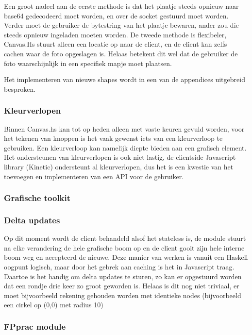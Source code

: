 Een groot nadeel aan de eerste methode is dat het plaatje steeds opnieuw naar base64 gedecodeerd moet worden, en over de socket gestuurd moet worden. Verder moet de gebruiker de bytestring van het plaatje bewaren, ander zou die steeds opnieuw ingeladen moeten worden. De tweede methode is flexibeler, Canvas.Hs stuurt alleen een locatie op naar de client, en de client kan zelfs cachen waar de foto opgeslagen is. Helaas betekent dit wel dat de gebruiker de foto waarschijnlijk in een specifiek mapje moet plaatsen.

Het implementeren van nieuwe shapes wordt in een van de appendices uitgebreid besproken.

\subsubsection{Kleurverlopen}
Binnen Canvas.hs kan tot op heden alleen met vaste keuren gevuld worden, voor het tekenen van knoppen is het vaak gewenst iets van een kleurverloop te gebruiken. Een kleurverloop kan namelijk diepte bieden aan een grafisch element. Het ondersteunen van kleurverlopen is ook niet lastig, de clientside Javascript library (Kinetic) ondersteunt al kleurverlopen, dus het is een kwestie van het toevoegen en implementeren van een API voor de gebruiker.

\subsubsection{Grafische toolkit}
\subsubsection{Delta updates}
Op dit moment wordt de client behandeld alsof het stateless is, de module stuurt na elke verandering de hele grafische boom op en de client gooit zijn hele interne boom weg en accepteerd de nieuwe. Deze manier van werken is vanuit een Haskell oogpunt logisch, maar door het gebrek aan caching is het in Javascript traag. Daartoe is het handig om delta updates te sturen, zo kan er opgestuurd worden dat een rondje drie keer zo groot geworden is. Helaas is dit nog niet triviaal, er moet bijvoorbeeld rekening gehouden worden met identieke nodes (bijvoorbeeld een cirkel op (0,0) met radius 10)
\subsubsection{FPprac module}
